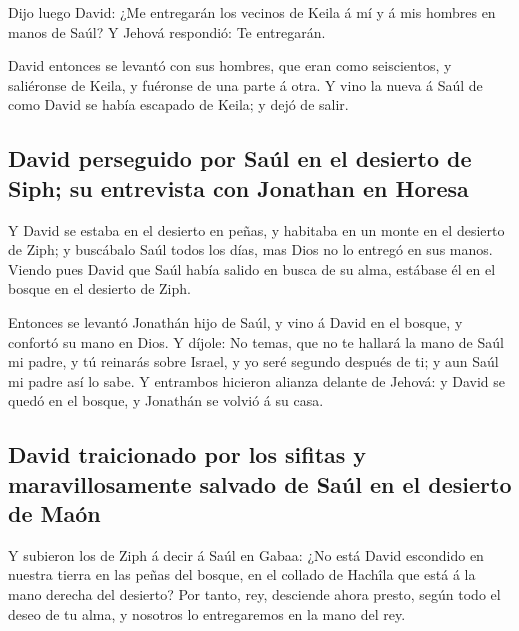  Dijo luego David: ¿Me entregarán los vecinos de Keila á mí
y á mis hombres en manos de Saúl? Y Jehová respondió: Te entregarán.

 David entonces se levantó con sus hombres, que eran como
seiscientos, y saliéronse de Keila, y fuéronse de una parte á otra. Y
vino la nueva á Saúl de como David se había escapado de Keila; y dejó de
salir.

\hypertarget{david-perseguido-por-sauxfal-en-el-desierto-de-siph-su-entrevista-con-jonathan-en-horesa}{%
\subsection{David perseguido por Saúl en el desierto de Siph; su
entrevista con Jonathan en
Horesa}\label{david-perseguido-por-sauxfal-en-el-desierto-de-siph-su-entrevista-con-jonathan-en-horesa}}

 Y David se estaba en el desierto en peñas, y habitaba en
un monte en el desierto de Ziph; y buscábalo Saúl todos los días, mas
Dios no lo entregó en sus manos.  Viendo pues David que
Saúl había salido en busca de su alma, estábase él en el bosque en el
desierto de Ziph.

 Entonces se levantó Jonathán hijo de Saúl, y vino á David
en el bosque, y confortó su mano en Dios.  Y díjole: No
temas, que no te hallará la mano de Saúl mi padre, y tú reinarás sobre
Israel, y yo seré segundo después de ti; y aun Saúl mi padre así lo
sabe.  Y entrambos hicieron alianza delante de Jehová: y
David se quedó en el bosque, y Jonathán se volvió á su casa.

\hypertarget{david-traicionado-por-los-sifitas-y-maravillosamente-salvado-de-sauxfal-en-el-desierto-de-mauxf3n}{%
\subsection{David traicionado por los sifitas y maravillosamente salvado
de Saúl en el desierto de
Maón}\label{david-traicionado-por-los-sifitas-y-maravillosamente-salvado-de-sauxfal-en-el-desierto-de-mauxf3n}}

 Y subieron los de Ziph á decir á Saúl en Gabaa: ¿No está
David escondido en nuestra tierra en las peñas del bosque, en el collado
de Hachîla que está á la mano derecha del desierto?  Por
tanto, rey, desciende ahora presto, según todo el deseo de tu alma, y
nosotros lo entregaremos en la mano del rey.

